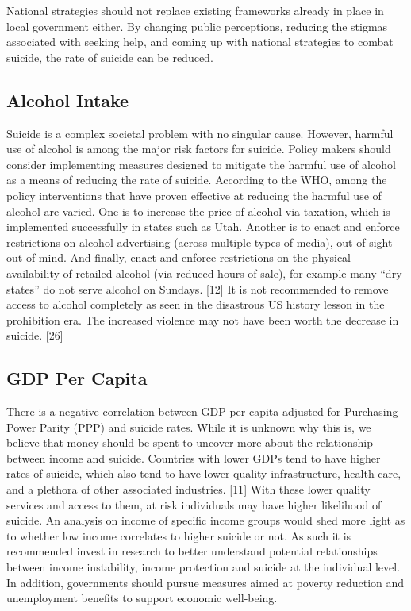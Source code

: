 \documentclass[]{article}
\begin{document}
National strategies should not replace existing frameworks already in
place in local government either. By changing public perceptions,
reducing the stigmas associated with seeking help, and coming up with
national strategies to combat suicide, the rate of suicide can be
reduced.

\subsection{Alcohol Intake}\label{alcohol-intake}

Suicide is a complex societal problem with no singular cause. However,
harmful use of alcohol is among the major risk factors for suicide.
Policy makers should consider implementing measures designed to mitigate
the harmful use of alcohol as a means of reducing the rate of suicide.
According to the WHO, among the policy interventions that have proven
effective at reducing the harmful use of alcohol are varied. One is to
increase the price of alcohol via taxation, which is implemented
successfully in states such as Utah. Another is to enact and enforce
restrictions on alcohol advertising (across multiple types of media),
out of sight out of mind. And finally, enact and enforce restrictions on
the physical availability of retailed alcohol (via reduced hours of
sale), for example many ``dry states'' do not serve alcohol on Sundays.
{[}12{]} It is not recommended to remove access to alcohol completely as
seen in the disastrous US history lesson in the prohibition era. The
increased violence may not have been worth the decrease in suicide.
{[}26{]}

\subsection{GDP Per Capita}\label{gdp-per-capita}

There is a negative correlation between GDP per capita adjusted for
Purchasing Power Parity (PPP) and suicide rates. While it is unknown why
this is, we believe that money should be spent to uncover more about the
relationship between income and suicide. Countries with lower GDPs tend
to have higher rates of suicide, which also tend to have lower quality
infrastructure, health care, and a plethora of other associated
industries. {[}11{]} With these lower quality services and access to
them, at risk individuals may have higher likelihood of suicide. An
analysis on income of specific income groups would shed more light as to
whether low income correlates to higher suicide or not. As such it is
recommended invest in research to better understand potential
relationships between income instability, income protection and suicide
at the individual level. In addition, governments should pursue measures
aimed at poverty reduction and unemployment benefits to support economic
well-being.
\end{document}
